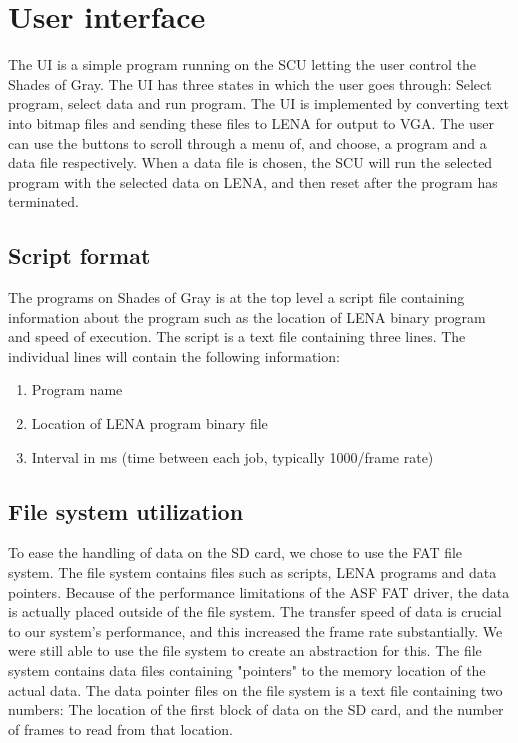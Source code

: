 \section{User interface}
The \ac{UI} is a simple program running on the \ac{SCU} letting the user control the { Shades of Gray}. The \ac{UI} has three states in which the user goes through: Select program, select data and run program. The \ac{UI} is implemented by converting text into bitmap files and sending these files to \ac{LENA} for output to VGA. The user can use the buttons to scroll through a menu of, and choose, a program and a data file respectively. When a data file is chosen, the \ac{SCU} will run the selected program with the selected data on \ac{LENA}, and then reset after the program has terminated.


\subsection{Script format}
The programs on { Shades of Gray} is at the top level a script file
containing information about the program such as the location of \ac{LENA} binary program and speed of execution. The script is a text file containing three lines. The individual lines will
contain the following information:

\begin{enumerate}
\item Program name
\item Location of \ac{LENA} program binary file
\item Interval in ms (time between each job, typically 1000/frame rate)
\end{enumerate}

\subsection{File system utilization}
To ease the handling of data on the SD card, we chose to use the FAT
file system. The file system contains files such as scripts, \ac{LENA} programs
and data pointers. Because of the performance limitations of the \ac{ASF} FAT driver, the data is actually
placed outside of the file system. The transfer speed of data is crucial to our
system's performance, and this increased the frame rate substantially. We were
still able to use the file system to create an abstraction for this. The file
system contains data files containing "pointers" to the memory location of the
actual data. The data pointer files on the file system is a text file containing
two numbers: The location of the first block of data on the SD card,
and the number of frames to read from that location.

